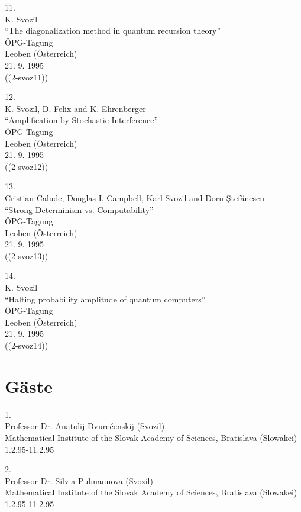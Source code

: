 11.\\
K. Svozil\\
``The diagonalization method in quantum recursion theory''\\
\"OPG-Tagung\\
Leoben (\"Osterreich)\\
21. 9. 1995             \\
((2-svoz11))

12.\\
K. Svozil, D. Felix and K. Ehrenberger\\
``Amplification by Stochastic Interference''\\
\"OPG-Tagung\\
Leoben (\"Osterreich)\\
21. 9. 1995               \\
((2-svoz12))

13.\\
Cristian Calude,
Douglas I. Campbell,
 Karl Svozil and
Doru \c{S}tef\u anescu \\
``Strong Determinism vs.  Computability''\\
\"OPG-Tagung\\
Leoben (\"Osterreich)\\
21. 9. 1995                 \\
((2-svoz13))

14.\\
K. Svozil\\
``Halting probability amplitude of quantum
computers''\\
\"OPG-Tagung\\
Leoben (\"Osterreich)\\
21. 9. 1995                   \\
((2-svoz14))



\section{G\"aste}

1.\\
Professor Dr. Anatolij Dvure\v{c}enskij (Svozil)\\
Mathematical Institute of the Slovak Academy of Sciences, Bratislava
(Slowakei)\\
1.2.95-11.2.95


2.\\
Professor Dr. Silvia Pulmannova (Svozil)\\
Mathematical Institute of the Slovak Academy of Sciences, Bratislava
(Slowakei)\\
1.2.95-11.2.95

